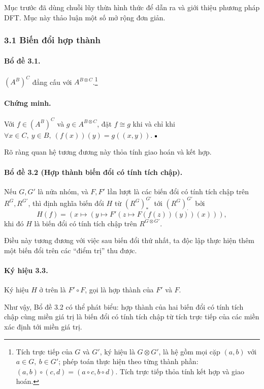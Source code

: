 \documentclass[11pt]{article}
\newcommand{\qedmark}{\hfill\rule{0.7ex}{0.7ex}}
\begin{document}
Mục trước đã dùng chuỗi lũy thừa hình thức để dẫn ra và giới thiệu phương pháp
DFT. Mục này thảo luận một số mở rộng đơn giản.

\subsubsection*{3.1 Biến đổi hợp thành}

\paragraph{Bổ đề 3.1.}
\((A^B)^C\) đẳng cấu với \(A^{B\otimes C}\).\footnote{Tích trực tiếp của \(G\)
và \(G'\), ký hiệu là \(G\otimes G'\), là hệ gồm mọi cặp \((a,b)\) với
\(a\in G,\ b\in G'\); phép toán thực hiện theo từng thành phần:
\((a,b)\circ(c,d)=(a\circ c,b\circ d)\). Tích trực tiếp thỏa tính kết hợp và
giao hoán.}

\paragraph{Chứng minh.}
Với \(f\in(A^B)^C\) và \(g\in A^{B\otimes C}\), đặt \(f\cong g\) khi và chỉ khi
\(\forall x\in C,\ y\in B,\ (f(x))(y)=g((x,y))\). \(\qedmark\)

Rõ ràng quan hệ tương đương này thỏa tính giao hoán và kết hợp.

\paragraph{Bổ đề 3.2 (Hợp thành biến đổi có tính tích chập).}
Nếu \(G,G'\) là nửa nhóm, và \(F,F'\) lần lượt là các biến đổi có tính tích chập
trên \(R^G,R^{G'}\), thì định nghĩa biến đổi \(H\) từ \((R^G)^{G'}_*\) tới
\((R^G)^{G'}_{\cdot}\) bởi
\[
  H(f)=\left(x\mapsto
  \left(y\mapsto F'\left(z\mapsto F(f(z))(y)\right)(x)\right)\right),
\]
khi đó \(H\) là biến đổi có tính tích chập trên \(R^{G\otimes G'}\).

Điều này tương đương với việc sau biến đổi thứ nhất, ta độc lập thực hiện thêm
một biến đổi trên các ``điểm trị'' thu được.

\paragraph{Ký hiệu 3.3.}
Ký hiệu \(H\) ở trên là \(F'\circ F\), gọi là hợp thành của \(F'\) và \(F\).

Như vậy, Bổ đề 3.2 có thể phát biểu: hợp thành của hai biến đổi có tính tích
chập cùng miền giá trị là biến đổi có tính tích chập từ tích trực tiếp của các
miền xác định tới miền giá trị.
\end{document}
